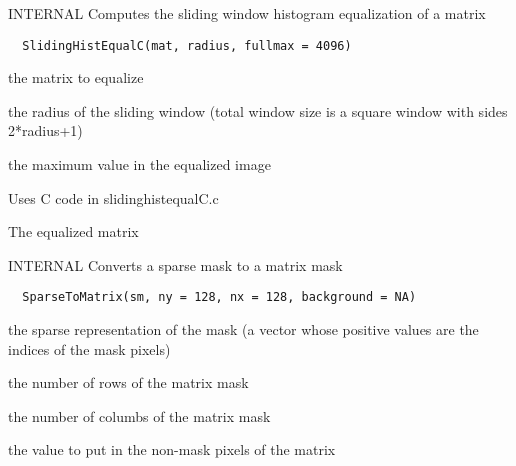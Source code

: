 \documentclass[a4paper]{book}
\begin{document}
%
\begin{Description}\relax
INTERNAL Computes the sliding window histogram
equalization of a matrix
\end{Description}
%
\begin{Usage}
\begin{verbatim}
  SlidingHistEqualC(mat, radius, fullmax = 4096)
\end{verbatim}
\end{Usage}
%
\begin{Arguments}
\begin{ldescription}
\item[\code{mat}] the matrix to equalize

\item[\code{radius}] the radius of the sliding window (total
window size is a square window with sides 2*radius+1)

\item[\code{fullmax}] the maximum value in the equalized image
\end{ldescription}
\end{Arguments}
%
\begin{Details}\relax
Uses C code in slidinghistequalC.c
\end{Details}
%
\begin{Value}
The equalized matrix
\end{Value}
%
\begin{Description}\relax
INTERNAL Converts a sparse mask to a matrix mask
\end{Description}
%
\begin{Usage}
\begin{verbatim}
  SparseToMatrix(sm, ny = 128, nx = 128, background = NA)
\end{verbatim}
\end{Usage}
%
\begin{Arguments}
\begin{ldescription}
\item[\code{sm}] the sparse representation of the mask (a vector
whose positive values are the indices of the mask
pixels)

\item[\code{ny}] the number of rows of the matrix mask

\item[\code{nx}] the number of columbs of the matrix mask

\item[\code{background}] the value to put in the non-mask pixels
of the matrix
\end{ldescription}
\end{Arguments}
\end{document}
